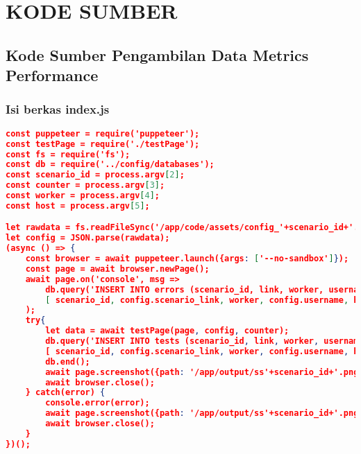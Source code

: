 \chapter{KODE SUMBER}

\section*{Kode Sumber Pengambilan Data Metrics Performance} \label{puppeteer}
	\subsection*{Isi berkas index.js}
\begin{lstlisting}[frame=single,tabsize=2,breaklines,caption={Isi berkas index.js},label=indexjs, captionpos=b, language=json]
const puppeteer = require('puppeteer');
const testPage = require('./testPage');
const fs = require('fs');
const db = require('../config/databases');
const scenario_id = process.argv[2];
const counter = process.argv[3];
const worker = process.argv[4];
const host = process.argv[5];

let rawdata = fs.readFileSync('/app/code/assets/config_'+scenario_id+'.json');  
let config = JSON.parse(rawdata);
(async () => {
	const browser = await puppeteer.launch({args: ['--no-sandbox']});
	const page = await browser.newPage();
	await page.on('console', msg => 
		db.query('INSERT INTO errors (scenario_id, link, worker, username, host, type, text, location_url) VALUES (?, ?, ?, ?, ?, ?, ?, ?)', 
		[ scenario_id, config.scenario_link, worker, config.username, host, msg._type, msg._text, msg._location.url ])
	);
	try{
		let data = await testPage(page, config, counter);
		db.query('INSERT INTO tests (scenario_id, link, worker, username, host, response_end, dom_interactive, dom_content_load, load_event_end, css_trace_start, css_trace_end, first_meaningful, timestamp) VALUES (?, ?, ?, ?, ?, ?, ?, ?, ?, ?, ?, ?, ?)', 
		[ scenario_id, config.scenario_link, worker, config.username, host, data.Timing.responseEnd, data.Timing.domInteractive, data.Timing.domContentLoadedEventEnd, data.Timing.loadEventEnd, data.TraceResult.cssStart, data.TraceResult.cssEnd, data.Metrics.FirstMeaningfulPaint, data.Metrics.Timestamp ]);
		db.end();
		await page.screenshot({path: '/app/output/ss'+scenario_id+'.png'});
		await browser.close();
	} catch(error) {
		console.error(error);
		await page.screenshot({path: '/app/output/ss'+scenario_id+'.png'});
		await browser.close();
	}
})();
\end{lstlisting}

